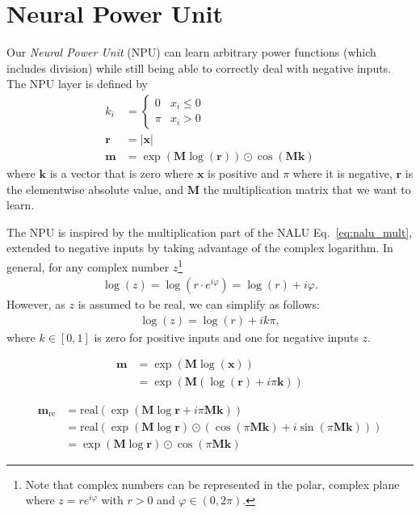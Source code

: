 \documentclass[9pt]{article}
\newcommand{\real}{\text{real}}
\begin{document}
\section{Neural Power Unit}%
\label{sec:neural_power_unit}

Our \emph{Neural Power Unit} (NPU) can learn arbitrary power functions (which
includes division) while still being able to correctly deal with negative
inputs.  The NPU layer is defined by
\begin{align}
  k_i &= \begin{cases}
     0  & x_i \leq 0 \\
    \pi & x_i > 0
  \end{cases} \\
  \bm r &= |\bm x| \\
  \bm m &= \exp(\bm M \log(\bm r)) \odot \cos(\bm M \bm k)
\end{align}
where $\bm k$ is a vector that is zero where $\bm x$ is positive and $\pi$
where it is negative, $\bm r$ is the elementwise absolute value, and $\bm M$
the multiplication matrix that we want to learn.

The NPU is inspired by the multiplication part of the NALU
Eq.~\ref{eq:nalu_mult}, extended to negative inputs by taking advantage of the
complex logarithm. In general, for any complex number $z$\footnote{Note that
complex numbers can be represented in the polar, complex plane where
$z=re^{i\varphi}$ with $r>0$ and $\varphi \in (0,2\pi)$.}
\begin{align}
  \log(z) = \log\left(r\cdot e^{i\varphi}\right)
     = \log(r) + i\varphi.
\end{align}
However, as $z$ is assumed to be real, we can simplify as follows:
\begin{align}
  \log(z) = \log(r) + ik\pi,
\end{align}
where $k \in [0,1]$ is zero for positive inputs and one for negative inputs $z$.

\begin{align}
  \bm m &= \exp(\bm M \log(\bm x)) \\
    &= \exp(\bm M ( \log(\bm r) + i\pi\bm k ))
\end{align}

\begin{align}
  \bm m_{\text{re}} &= \real(\exp(\bm M \log \bm r + i\pi\bm M\bm k)) \\
    &= \real(\exp(\bm M \log \bm r) \odot (\cos(\pi \bm M \bm k) + i \sin(\pi \bm M \bm k))) \\
    &= \exp(\bm M \log \bm r) \odot \cos(\pi \bm M \bm k)
\end{align}
\end{document}
